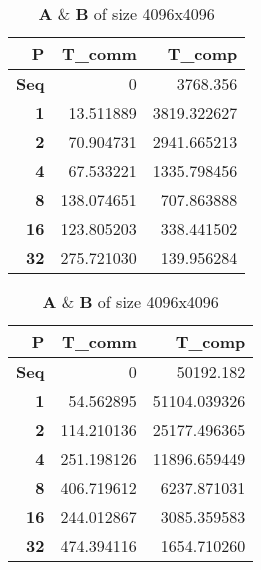 \begin{table}[!ht]
\begin{subtable}{.45\linewidth}
    \end{subtable}
    \begin{subtable}{.45\linewidth}
        \centering
        \caption{$\textbf{A}$ \& $\textbf{B}$ of size 2048x2048}
        \begin{tabular}{r|r|r}
            \textbf{P} & \textbf{T\_comm} & \textbf{T\_comp} \\ \hline
            \textbf{Seq} & 0 & 3768.356 \\ \hline
            \textbf{1} & 13.511889 & 3819.322627 \\ \hline
            \textbf{2} & 70.904731 & 2941.665213 \\ \hline
            \textbf{4} & 67.533221 & 1335.798456 \\ \hline
            \textbf{8} & 138.074651 & 707.863888 \\ \hline
            \textbf{16} & 123.805203 & 338.441502 \\ \hline
            \textbf{32} & 275.721030 & 139.956284 \\ 
        \end{tabular}
    
    \end{subtable}
    \begin{subtable}{.45\linewidth}
        \centering
        \caption{$\textbf{A}$ \& $\textbf{B}$ of size 4096x4096}
        \begin{tabular}{r|r|r}
            \textbf{P} & \textbf{T\_comm} & \textbf{T\_comp} \\ \hline
            \textbf{Seq} & 0 & 50192.182 \\ \hline
            \textbf{1} & 54.562895 & 51104.039326 \\ \hline
            \textbf{2} & 114.210136 & 25177.496365 \\ \hline
            \textbf{4} & 251.198126 & 11896.659449 \\ \hline
            \textbf{8} & 406.719612 & 6237.871031 \\ \hline
            \textbf{16} & 244.012867 & 3085.359583 \\ \hline
            \textbf{32} & 474.394116 & 1654.710260 \\ 
        \end{tabular}
    
    \end{subtable}
    
    \label{tab:results}
\end{table}